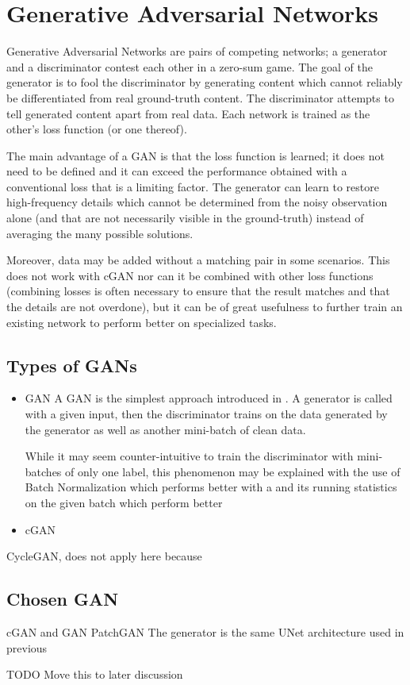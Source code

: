 \chapter{Generative Adversarial Networks}

Generative Adversarial Networks are pairs of competing networks; a generator and a discriminator contest each other in a zero-sum game. The goal of the generator is to fool the discriminator by generating content which cannot reliably be differentiated from real ground-truth content. The discriminator attempts to tell generated content apart from real data. Each network is trained as the other's loss function (or one thereof).

The main advantage of a \acl{GAN} is that the loss function is learned; it does not need to be defined and it can exceed the performance obtained with a conventional loss that is a limiting factor. The generator can learn to restore high-frequency details which cannot be determined from the noisy observation alone (and that are not necessarily visible in the ground-truth) instead of averaging the many possible solutions.

Moreover, data may be added without a matching pair in some scenarios. This does not work with \acl{cGAN} nor can it be combined with other loss functions (combining losses is often necessary to ensure that the result matches and that the details are not overdone), but it can be of great usefulness to further train an existing network to perform better on specialized tasks.

\section{Types of GANs}

\begin{itemize}
  \item \ac{GAN}
  A \ac{GAN} is the simplest approach introduced in \cite{gan}. A generator is called with a given input, then the discriminator trains on the data generated by the generator as well as another mini-batch of clean data. 
  
  
  While it may seem counter-intuitive to train the discriminator with mini-batches of only one label, this phenomenon may be explained with the use of Batch Normalization which performs better with a \cite{gantechniques}
  and its running statistics on the given batch which perform better
  \item \ac{cGAN}
  
\end{itemize}
CycleGAN, does not apply here because

\section{Chosen GAN}
cGAN and GAN
PatchGAN
The generator is the same UNet architecture used in previous

TODO Move this to later discussion


